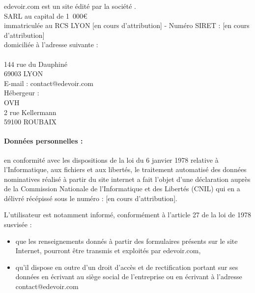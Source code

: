 edevoir.com est un site édité par la société \textbf{\eDevoir}.\\

SARL \eDevoir au capital de 1~000\euro\\
immatriculée au RCS LYON [en cours d'attribution] - Numéro SIRET : [en cours d'attribution]\\

domiciliée à l'adresse suivante :\\
\eDevoir\\
144 rue du Dauphiné\\
69003 LYON\\
E-mail : contact@edevoir.com\\

Hébergeur :\\
OVH\\
2 rue Kellermann\\
59100 ROUBAIX

\paragraph*{Données personnelles :}
en conformité avec les dispositions de la loi du 6 janvier 1978 relative à l'Informatique, aux fichiers et aux libertés, le traitement automatisé des données nominatives réalisé à partir du site internet a fait l'objet d'une déclaration auprès de la Commission Nationale de l'Informatique et des Libertés (CNIL) qui en a délivré récépissé sous le numéro : [en cours d'attribution].

L'utilisateur est notamment informé, conformément à l'article 27 de la loi de 1978 susvisée :
\begin{itemize}
   \item que les renseignements donnés à partir des formulaires présents sur le site Internet, pourront être transmis et exploités par edevoir.com,
   \item qu'il dispose en outre d'un droit d'accès et de rectification portant sur ses données en écrivant au siège social de l'entreprise ou en écrivant à l'adresse contact@edevoir.com
\end{itemize}
